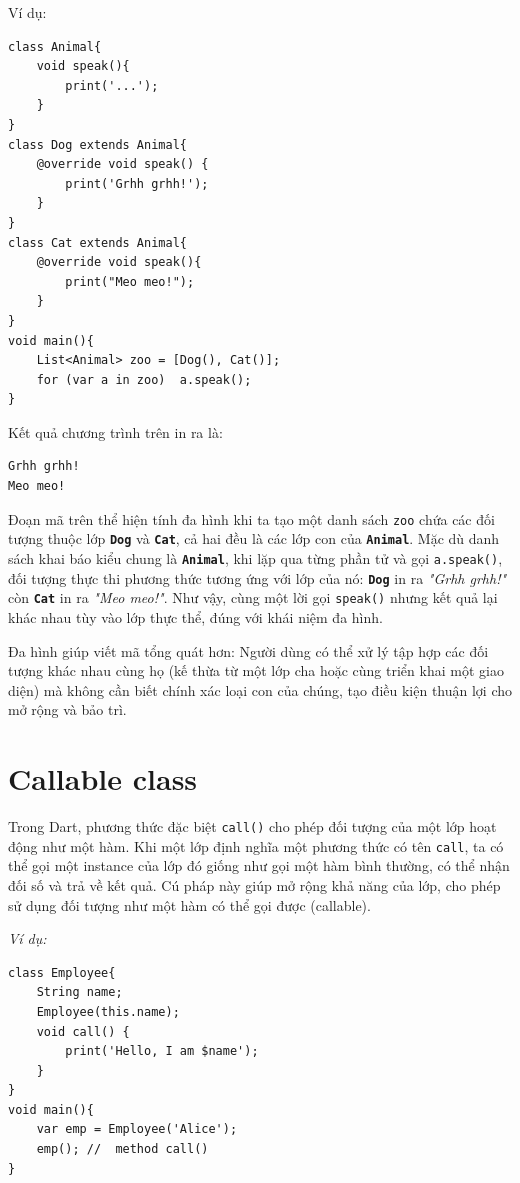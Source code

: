 \documentclass[../DoAn.tex]{subfiles}
\numberwithin{figure}{chapter}
\begin{document}
Ví dụ:
\begin{lstlisting}
class Animal{
    void speak(){
        print('...');
    }
}
class Dog extends Animal{
    @override void speak() { 
        print('Grhh grhh!'); 
    }
}
class Cat extends Animal{
    @override void speak(){
        print("Meo meo!");
    }
}
void main(){
    List<Animal> zoo = [Dog(), Cat()];
    for (var a in zoo)  a.speak(); 
}
\end{lstlisting}

Kết quả chương trình trên in ra là:
\begin{lstlisting}
Grhh grhh!
Meo meo!
\end{lstlisting}

Đoạn mã trên thể hiện tính đa hình khi ta tạo một danh sách \texttt{zoo} chứa các đối tượng thuộc lớp \textbf{\texttt{Dog}} và \textbf{\texttt{Cat}}, cả hai đều là các lớp con của \textbf{\texttt{Animal}}. Mặc dù danh sách khai báo kiểu chung là \textbf{\texttt{Animal}}, khi lặp qua từng phần tử và gọi \texttt{a.speak()}, đối tượng thực thi phương thức tương ứng với lớp của nó: \textbf{\texttt{Dog}} in ra \emph{{}"Grhh grhh!"} còn \textbf{\texttt{Cat}} in ra \emph{{}"Meo meo!"}. Như vậy, cùng một lời gọi \texttt{speak()} nhưng kết quả lại khác nhau tùy vào lớp thực thể, đúng với khái niệm đa hình. 

Đa hình giúp viết mã tổng quát hơn: Người dùng có thể xử lý tập hợp các đối tượng khác nhau cùng họ (kế thừa từ một lớp cha hoặc cùng triển khai một giao diện) mà không cần biết chính xác loại con của chúng, tạo điều kiện thuận lợi cho mở rộng và bảo trì.

\section{Callable class}
Trong Dart, phương thức đặc biệt \verb|call()| cho phép đối tượng của một lớp hoạt động như một hàm. Khi một lớp định nghĩa một phương thức có tên \verb|call|, ta có thể gọi một instance của lớp đó giống như gọi một hàm bình thường, có thể nhận đối số và trả về kết quả. Cú pháp này giúp mở rộng khả năng của lớp, cho phép sử dụng đối tượng như một hàm có thể gọi được (callable). 

\textit{Ví dụ:}
\begin{lstlisting}
class Employee{
    String name;
    Employee(this.name);
    void call() { 
        print('Hello, I am $name'); 
    }
}
void main(){
    var emp = Employee('Alice');
    emp(); //  method call() 
}
\end{lstlisting}
\end{document}
